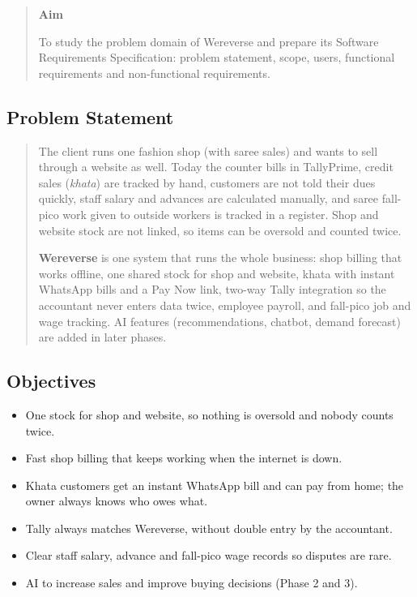 \documentclass[12pt,a4paper]{article}
\begin{document}
\begin{quote}
\textbf{Aim}

To study the problem domain of Wereverse and prepare its Software
Requirements Specification: problem statement, scope, users, functional
requirements and non-functional requirements.
\end{quote}

\subsection{Problem Statement}\label{problem-statement}

\begin{quote}
The client runs one fashion shop (with saree sales) and wants to sell
through a website as well. Today the counter bills in TallyPrime, credit
sales (\emph{khata}) are tracked by hand, customers are not told their
dues quickly, staff salary and advances are calculated manually, and
saree fall-pico work given to outside workers is tracked in a register.
Shop and website stock are not linked, so items can be oversold and
counted twice.

\textbf{Wereverse} is one system that runs the whole business: shop
billing that works offline, one shared stock for shop and website, khata
with instant WhatsApp bills and a Pay Now link, two-way Tally
integration so the accountant never enters data twice, employee payroll,
and fall-pico job and wage tracking. AI features (recommendations,
chatbot, demand forecast) are added in later phases.
\end{quote}

\subsection{Objectives}\label{objectives}

\begin{itemize}
\item
  One stock for shop and website, so nothing is oversold and nobody
  counts twice.
\item
  Fast shop billing that keeps working when the internet is down.
\item
  Khata customers get an instant WhatsApp bill and can pay from home;
  the owner always knows who owes what.
\item
  Tally always matches Wereverse, without double entry by the
  accountant.
\item
  Clear staff salary, advance and fall-pico wage records so disputes are
  rare.
\item
  AI to increase sales and improve buying decisions (Phase 2 and 3).
\end{itemize}
\end{document}
